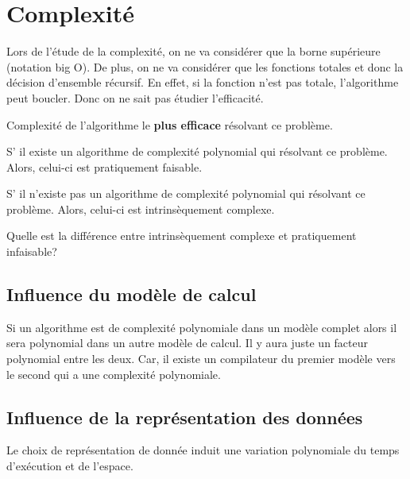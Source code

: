 
\section{Complexité}
\label{sec:complexit_}
Lors de l'étude de la complexité, on ne va considérer que la borne supérieure 
(notation big O). De plus, on ne va considérer que les fonctions totales et 
donc la décision d'ensemble récursif. 
En effet, si la fonction n'est pas totale, l'algorithme peut boucler. 
Donc on ne sait pas étudier l'efficacité.

\begin{mydef} Complexité de l'algorithme le 
	\textbf{plus efficace} résolvant ce problème.
\end{mydef}

\begin{mydef}
	S’ il existe un algorithme de complexité polynomial qui résolvant ce 
	problème. Alors, celui-ci est pratiquement faisable.
\end{mydef}

\begin{mydef}
	S’ il n'existe pas un algorithme de complexité polynomial qui résolvant ce 
	problème. Alors, celui-ci est intrinsèquement complexe.
\end{mydef}

\begin{myrem}
	Quelle est la différence entre intrinsèquement complexe et pratiquement 
	infaisable?
\end{myrem}

\subsection{Influence du modèle de calcul}
\label{sub:influence_du_mod_le_de_calcul}
Si un algorithme est de complexité polynomiale dans un modèle complet alors il sera 
polynomial dans un autre modèle de calcul. Il y aura juste un facteur 
polynomial entre les deux. Car, il existe un compilateur du premier modèle vers 
le second qui a une complexité polynomiale.

\subsection{Influence de la représentation des données}
\label{sub:influence_de_la_repr_sentation_des_donn_es}
Le choix de représentation de donnée induit une variation polynomiale du temps 
d'exécution et de l'espace.

